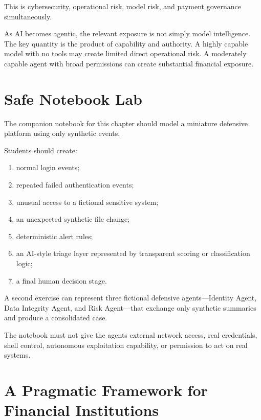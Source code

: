 This is cybersecurity, operational risk, model risk, and payment governance simultaneously.

\begin{risklens}
As AI becomes agentic, the relevant exposure is not simply model intelligence. The key quantity is the product of capability and authority. A highly capable model with no tools may create limited direct operational risk. A moderately capable agent with broad permissions can create substantial financial exposure.
\end{risklens}

\section{Safe Notebook Lab}

\begin{notebooklab}
The companion notebook for this chapter should model a miniature defensive platform using only synthetic events.

Students should create:
\begin{enumerate}
    \item normal login events;
    \item repeated failed authentication events;
    \item unusual access to a fictional sensitive system;
    \item an unexpected synthetic file change;
    \item deterministic alert rules;
    \item an AI-style triage layer represented by transparent scoring or classification logic;
    \item a final human decision stage.
\end{enumerate}

A second exercise can represent three fictional defensive agents---Identity Agent, Data Integrity Agent, and Risk Agent---that exchange only synthetic summaries and produce a consolidated case.

The notebook must not give the agents external network access, real credentials, shell control, autonomous exploitation capability, or permission to act on real systems.
\end{notebooklab}

\section{A Pragmatic Framework for Financial Institutions}


